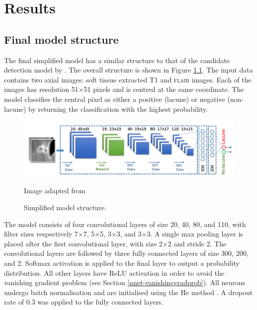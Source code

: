 %
%

\chapter{Results}\label{results}

\section{Final model structure}

The final simplified model has a similar structure to that of the candidate detection model by \cite{GhafoorianM.2017Dml3}. The overall structure is shown in Figure \ref{results-model-fig}. The input data contains two axial images: soft tissue extracted T1 and \textsc{flair} images. Each of the images has resolution 51$\times$51 pixels and is centred at the same coordinate. The model classifies the central pixel as either a positive (lacune) or negative (non-lacune) by returning the classification with the highest probability.
\begin{figure}[ht]
	\centering
	\includegraphics[width=\linewidth]{Images/7_simplified_model.png}
	\caption{\small{Simplified model structure.}}
	\small Image adapted from \cite{GhafoorianM.2017Dml3}
	\label{results-model-fig}
\end{figure}

The model consists of four convolutional layers of size 20, 40, 80, and 110, with filter sizes respectively 7$\times$7, 5$\times$5, 3$\times$3, and 3$\times$3. A single max pooling layer is placed after the first convolutional layer, with size 2$\times$2 and stride 2. The convolutional layers are followed by three fully connected layers of size 300, 200, and 2. Softmax activation is applied to the final layer to output a probability distribution. All other layers have ReLU activation in order to avoid the vanishing gradient problem (see Section \ref{nnet-vanishinggradprob}). All neurons undergo batch normalisation and are initialised using the He method \citep{HeKaiming2015DDiR}. A dropout rate of 0.3 was applied to the fully connected layers.

